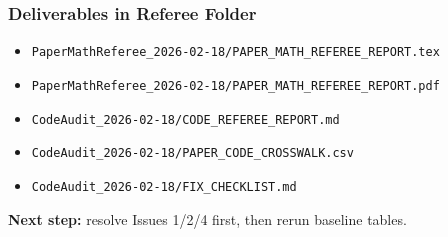 ﻿\documentclass[english,aspectratio=169]{beamer}
\begin{document}
\begin{frame}
\frametitle{Deliverables in Referee Folder}
\begin{itemize}
\item \texttt{PaperMathReferee\_2026-02-18/PAPER\_MATH\_REFEREE\_REPORT.tex}
\item \texttt{PaperMathReferee\_2026-02-18/PAPER\_MATH\_REFEREE\_REPORT.pdf}
\item \texttt{CodeAudit\_2026-02-18/CODE\_REFEREE\_REPORT.md}
\item \texttt{CodeAudit\_2026-02-18/PAPER\_CODE\_CROSSWALK.csv}
\item \texttt{CodeAudit\_2026-02-18/FIX\_CHECKLIST.md}
\end{itemize}
\vspace{2mm}
\textbf{Next step:} resolve Issues 1/2/4 first, then rerun baseline tables.
\end{frame}
\end{document}
